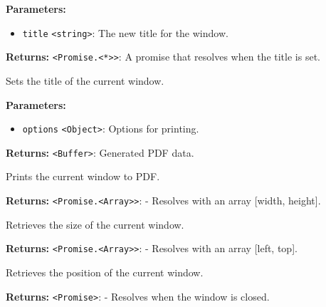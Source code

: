 \documentclass[12pt,a4paper]{article}
\begin{document}
\noindent \textbf{Parameters:}
\begin{itemize}
  \item \texttt{title} \texttt{<string>}: The new title for the window.
\end{itemize}

\noindent \textbf{Returns:} \texttt{<Promise.<*>>}: A promise that resolves when the title is set.

\noindent Sets the title of the current window.

\vspace{5mm}
\noindent {}


\noindent \textbf{Parameters:}
\begin{itemize}
  \item \texttt{options} \texttt{<Object>}: Options for printing.
\end{itemize}

\noindent \textbf{Returns:} \texttt{<Buffer>}: Generated PDF data.

\noindent Prints the current window to PDF.

\vspace{5mm}
\noindent {}


\noindent \textbf{Returns:} \texttt{<Promise.<Array>>}: - Resolves with an array [width, height].

\noindent Retrieves the size of the current window.

\vspace{5mm}
\noindent {}


\noindent \textbf{Returns:} \texttt{<Promise.<Array>>}: - Resolves with an array [left, top].

\noindent Retrieves the position of the current window.

\vspace{5mm}
\noindent {}


\noindent \textbf{Returns:} \texttt{<Promise>}: - Resolves when the window is closed.
\end{document}
